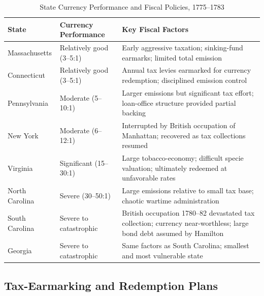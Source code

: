 \documentclass[12pt]{article}
\begin{document}
\begin{table}[htbp]
\centering
\caption{State Currency Performance and Fiscal Policies, 1775--1783}
\label{tab:states}
\begin{tabular}{llp{7cm}}
\toprule
\textbf{State} & \textbf{Currency Performance} & \textbf{Key Fiscal Factors} \\
\midrule
Massachusetts   & Relatively good (3--5:1)  & Early aggressive taxation; sinking-fund
                                              earmarks; limited total emission \\[4pt]
Connecticut     & Relatively good (3--5:1)  & Annual tax levies earmarked for currency
                                              redemption; disciplined emission control \\[4pt]
Pennsylvania    & Moderate (5--10:1)        & Larger emissions but significant tax effort;
                                              loan-office structure provided partial backing \\[4pt]
New York        & Moderate (6--12:1)        & Interrupted by British occupation of
                                              Manhattan; recovered as tax collections
                                              resumed \\[4pt]
Virginia        & Significant (15--30:1)    & Large tobacco-economy; difficult specie
                                              valuation; ultimately redeemed at
                                              unfavorable rates \\[4pt]
North Carolina  & Severe (30--50:1)         & Large emissions relative to small tax base;
                                              chaotic wartime administration \\[4pt]
South Carolina  & Severe to catastrophic    & British occupation 1780--82 devastated tax
                                              collection; currency near-worthless; large
                                              bond debt assumed by Hamilton \\[4pt]
Georgia         & Severe to catastrophic    & Same factors as South Carolina; smallest
                                              and most vulnerable state \\
\bottomrule
\end{tabular}
\end{table}

\subsection{Tax-Earmarking and Redemption Plans}
\end{document}
